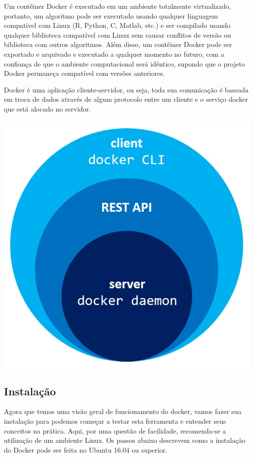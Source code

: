 \documentclass[]{article}
\begin{document}
Um contêiner Docker é executado em um ambiente totalmente virtualizado, portanto, um algoritmo pode ser executado usando qualquer linguagem compatível com Linux (R, Python, C, Matlab, etc.) e ser compilado usando qualquer biblioteca compatível com Linux sem causar conflitos de versão ou biblioteca com outros algoritmos. Além disso, um contêiner Docker pode ser exportado e arquivado e executado a qualquer momento no futuro, com a confiança de que o ambiente computacional será idêntico, supondo que o projeto Docker permaneça compatível com versões anteriores.

Docker é uma aplicação cliente-servidor, ou seja, toda sua comunicação é baseada em troca de dados através de algum protocolo entre um cliente e o serviço docker que está alocado no servidor.

\includegraphics{res/docker_api_infra.jpg}

\hypertarget{instalacao}{%
\subsection{Instalação}\label{instalacao}}

Agora que temos uma visão geral de funcionamento do docker, vamos fazer sua instalação para podemos começar a testar esta ferramenta e entender seus conceitos na prática. Aqui, por uma questão de facilidade, recomenda-se a utilização de um ambiente Linux. Os passos abaixo descrevem como a instalação do Docker pode ser feita no Ubuntu \textbar{}16.04\textbar{} ou superior.
\end{document}
